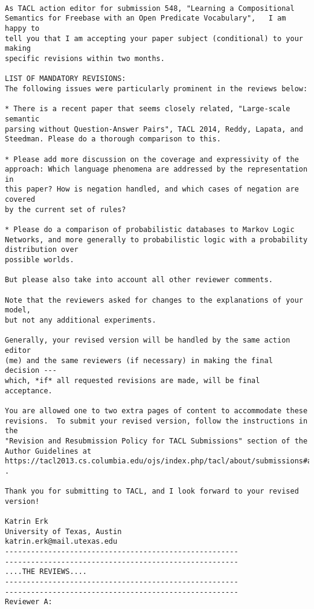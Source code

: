 \documentclass{article}[11pt,oneside]
\begin{document}
\begin{verbatim}

As TACL action editor for submission 548, "Learning a Compositional
Semantics for Freebase with an Open Predicate Vocabulary",   I am happy to
tell you that I am accepting your paper subject (conditional) to your making
specific revisions within two months.

LIST OF MANDATORY REVISIONS:
The following issues were particularly prominent in the reviews below:

* There is a recent paper that seems closely related, "Large-scale semantic
parsing without Question-Answer Pairs", TACL 2014, Reddy, Lapata, and
Steedman. Please do a thorough comparison to this.

* Please add more discussion on the coverage and expressivity of the
approach: Which language phenomena are addressed by the representation in
this paper? How is negation handled, and which cases of negation are covered
by the current set of rules?

* Please do a comparison of probabilistic databases to Markov Logic
Networks, and more generally to probabilistic logic with a probability
distribution over
possible worlds.

But please also take into account all other reviewer comments.

Note that the reviewers asked for changes to the explanations of your model,
but not any additional experiments.

Generally, your revised version will be handled by the same action editor
(me) and the same reviewers (if necessary) in making the final decision ---
which, *if* all requested revisions are made, will be final acceptance.

You are allowed one to two extra pages of content to accommodate these
revisions.  To submit your revised version, follow the instructions in the
"Revision and Resubmission Policy for TACL Submissions" section of the
Author Guidelines at
https://tacl2013.cs.columbia.edu/ojs/index.php/tacl/about/submissions#authorGuidelines
.

Thank you for submitting to TACL, and I look forward to your revised
version!

Katrin Erk
University of Texas, Austin
katrin.erk@mail.utexas.edu
------------------------------------------------------
------------------------------------------------------
....THE REVIEWS....
------------------------------------------------------
------------------------------------------------------
Reviewer A:


\end{verbatim}
\end{document}
